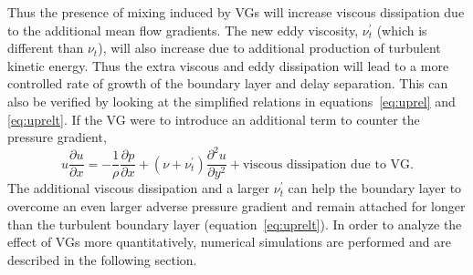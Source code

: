 Thus the presence of mixing induced by VGs will increase viscous dissipation due to the additional mean flow gradients. The new eddy viscosity, $\nu_t^\prime$ (which is different than $\nu_t$), will also increase due to additional production of turbulent kinetic energy. Thus the extra viscous and eddy dissipation will lead to a more controlled rate of growth of the boundary layer and delay separation. This can also be verified by looking at the simplified relations in equations~\ref{eq:uprel} and \ref{eq:uprelt}. If the VG were to introduce an additional term to counter the pressure gradient,
\begin{equation}
u\frac{\partial u}{\partial x} = -\frac{1}{\rho}\frac{\partial p}{\partial x} + (\nu+\nu_t^\prime)\frac{\partial^2 u}{\partial y^2} + \text{viscous dissipation due to VG}.
\label{eq:uprelvg}
\end{equation}
The additional viscous dissipation and a larger $\nu_t^\prime$ can help the boundary layer to overcome an even larger adverse pressure gradient and remain attached for longer than the turbulent boundary layer (equation~\ref{eq:uprelt}). 
\noindent
In order to analyze the effect of VGs more quantitatively, numerical simulations are performed and are described in the following section.

